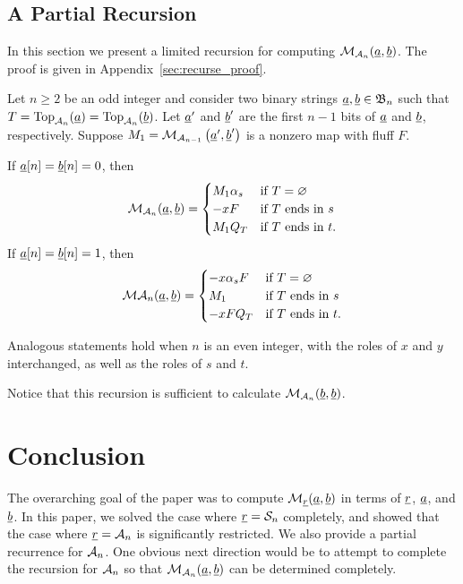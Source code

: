 \subsection{A Partial Recursion}
In this section we present a limited recursion for computing $\MM_{\AA_n}(\ul a, \ul b)$.  The proof is given in Appendix~\ref{sec:recurse_proof}.

\begin{proposition}
	Let $n \ge 2$ be an odd integer and consider two binary strings $\ul a, \ul b \in \BB_n$ such that $T = \Top_{\AA_n}(\ul a) = \Top_{\AA_n}(\ul b)$.  
	Let $\ul a'$ and $\ul b'$ are the first $n-1$ bits of $\ul a$ and $\ul b$, respectively. 
	Suppose $M_1 = \MM_{\AA_{n-1}} \left(\ul a', \ul b'\right)$ is a nonzero map with fluff $F$.
	\begin{enumerate}[(i)]
		\ii If $\ul a[n] = \ul b[n] = 0$, then
		\[ \MM_{\AA_n} (\ul a, \ul b)
			=
			\begin{cases}
				M_1 \alpha_s & \text{if $T = \varnothing$} \\ %
				-xF & \text{if $T$ ends in $s$} \\ %
				M_1 Q_T & \text{if $T$ ends in $t$}. \\ %
			\end{cases}
		\]
		\ii If $\ul a[n] = \ul b[n] = 1$, then
		\[
			\MM \AA_n (\ul a, \ul b)
			=
			\begin{cases}
				-x\alpha_sF & \text{if $T = \varnothing$} \\ %
				M_1 & \text{if $T$ ends in $s$} \\ %
				-xF Q_T & \text{if $T$ ends in $t$}. %
			\end{cases}
		\]
	\end{enumerate}
	Analogous statements hold when $n$ is an even integer, with the roles of $x$ and $y$ interchanged, as well as the roles of $s$ and $t$.
	\label{thm:recurse}
\end{proposition}

Notice that this recursion is sufficient to calculate $\MM_{\AA_n}(\ul b, \ul b)$.


\section{Conclusion}
The overarching goal of the paper was to compute $\MM_{\ul r} (\ul a, \ul b)$ in terms of $\ul r$, $\ul a$, and $\ul b$.  In this paper, we solved the case where $\ul r = \SS_n$ completely, and showed that the case where $\ul r = \AA_n$ is significantly restricted.  We also provide a partial recurrence for $\AA_n$.  One obvious next direction would be to attempt to complete the recursion for $\AA_n$ so that $\MM_{\AA_n} (\ul a, \ul b)$ can be determined completely.

